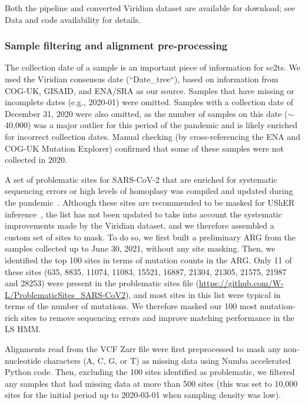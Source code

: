 \documentclass[12pt]{article}
\begin{document}
Both the pipeline and converted Viridian dataset are available for download;
see Data and code availability for details.


\subsubsection*{Sample filtering and alignment pre-processing}

The collection date of a sample
is an important piece of information for sc2ts.
We used the Viridian consensus date (``Date\_tree``),
based on information from COG-UK, GISAID, and ENA/SRA as our source.
Samples that have missing or incomplete dates (e.g., 2020-01) were omitted.
Samples with a collection date of December 31, 2020
were also omitted,
as the number of samples on this date ($\sim$40,000) was a major outlier
for this period of the pandemic and is likely enriched
for incorrect collection dates.
Manual checking (by cross-referencing the ENA and COG-UK Mutation Explorer)
confirmed that some of these samples were not collected in 2020.

A set of problematic sites
for SARS-CoV-2 that are enriched for systematic sequencing errors or
high levels of homoplasy was compiled and updated during
the pandemic~\cite{DeMaio2020issues,Turakhia2020stability}.
Although these sites are recommended to be masked for UShER
inference~\cite{Turakhia2020stability},
the list has not been updated to take into account
the systematic improvements made by the Viridian dataset, and
we therefore assembled a custom set of sites to mask.
To do so, we first built a preliminary ARG
from the samples collected up to June 30, 2021,
without any site masking.
Then, we identified the top 100 sites
in terms of mutation counts in the ARG.
Only 11 of these sites
(635, 8835, 11074, 11083, 15521, 16887,
21304, 21305, 21575, 21987 and 28253)
were present in the problematic sites file
(\url{https://github.com/W-L/ProblematicSites_SARS-CoV2}),
and most sites in this list were typical
in terms of the number of mutations.
We therefore masked our 100 most mutation-rich sites
to remove sequencing errors and
improve matching performance in the LS HMM.

Alignments read from the VCF Zarr file were first preprocessed
to mask any non-nucleotide characters (A, C, G, or T) as missing data
using Numba accelerated \cite{Lam2015numba} Python code.
Then, excluding the 100 sites identified as problematic, we filtered any samples that had missing data at more than 500 sites (this was set to 10,000 sites for the initial period up to 2020-03-01
when sampling density was low).
\end{document}
